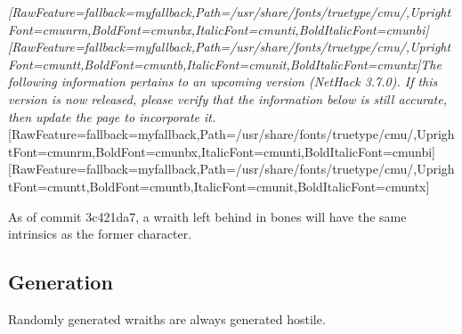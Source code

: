 \documentclass[fontsize=11pt,paper=A4,BCOR=12mm,DIV=13,open=any,listof=totoc,toc=flat]{scrbook}
\begin{document}
{\itshape \allowbreak{}\setmainfont{cmunti.ttf}[RawFeature={fallback=myfallback},Path=/usr/share/fonts/truetype/cmu/,UprightFont=cmunrm,BoldFont=cmunbx,ItalicFont=cmunti,BoldItalicFont=cmunbi]\setmonofont{cmunti.ttf}[RawFeature={fallback=myfallback},Path=/usr/share/fonts/truetype/cmu/,UprightFont=cmuntt,BoldFont=cmuntb,ItalicFont=cmunit,BoldItalicFont=cmuntx]\itshape The following information pertains to an upcoming version (NetHack 3.7.0\footnotemark[19]). If this version is now released, please verify that the information below is still accurate, then update the page to incorporate it.}\allowbreak{}\setmainfont{cmunrm.ttf}[RawFeature={fallback=myfallback},Path=/usr/share/fonts/truetype/cmu/,UprightFont=cmunrm,BoldFont=cmunbx,ItalicFont=cmunti,BoldItalicFont=cmunbi]\setmonofont{cmunrm.ttf}[RawFeature={fallback=myfallback},Path=/usr/share/fonts/truetype/cmu/,UprightFont=cmuntt,BoldFont=cmuntb,ItalicFont=cmunit,BoldItalicFont=cmuntx]



As of commit 3c421da7\footnotemark[20], a wraith left behind in bones will have the same intrinsics as the former character.
\subsection{Generation}
\label{2}
Randomly generated wraiths are always generated hostile.
\end{document}
